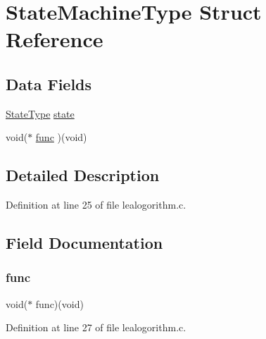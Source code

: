 \hypertarget{struct_state_machine_type}{}\section{State\+Machine\+Type Struct Reference}
\label{struct_state_machine_type}
\subsection*{Data Fields}
\begin{DoxyCompactItemize}
\item 
\mbox{\hyperlink{scan_2lealogorithm_8c_a1615968a92950438f6e67a28e9d56e5c}{State\+Type}} \mbox{\hyperlink{struct_state_machine_type_a4d1aa26dcfa648e02cbb0964cddbdbfe}{state}}
\item 
void($\ast$ \mbox{\hyperlink{struct_state_machine_type_af406187a441c51e4589704fae05f15fe}{func}} )(void)
\end{DoxyCompactItemize}


\subsection{Detailed Description}


Definition at line 25 of file lealogorithm.\+c.



\subsection{Field Documentation}
\mbox{\label{struct_state_machine_type_af406187a441c51e4589704fae05f15fe}} 
\subsubsection{\texorpdfstring{func}{func}}
{\footnotesize\ttfamily void($\ast$ func)(void)}



Definition at line 27 of file lealogorithm.\+c.

\mbox{\label{struct_state_machine_type_a4d1aa26dcfa648e02cbb0964cddbdbfe}} 
